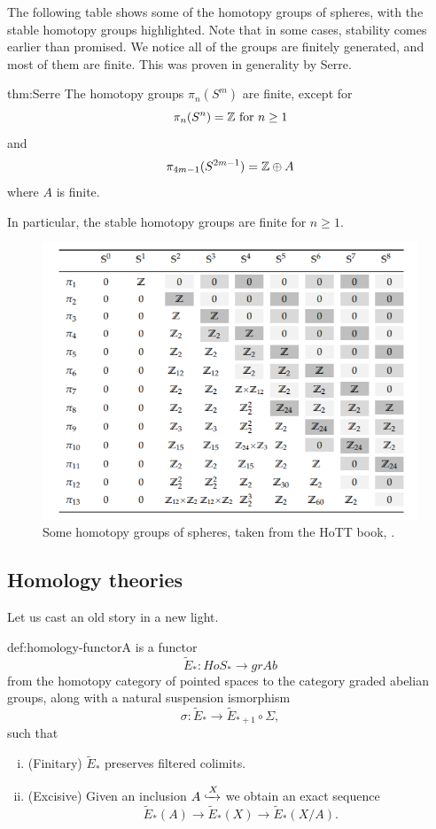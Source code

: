The following table shows some of the homotopy groups of spheres, with the stable homotopy groups highlighted. Note that in some cases, stability comes earlier than promised. We notice all of the groups are finitely generated, and most of them are finite. This was proven in generality by Serre.
\begin{theorem}[Serre]{thm:Serre}
    The homotopy groups $\pi_n(S^m)$  are finite, except for
    $$\pi_n(S^n)=\mathbb{Z} \text{ for } n\geq 1$$
    and $$\pi_{4m-1}(S^{2m-1})=\mathbb{Z}\oplus A$$
    where $A$ is finite.
\end{theorem}

In particular, the stable homotopy groups are finite for $n\geq 1.$
\begin{figure}[h!]
\includegraphics[width=14cm]{Content/stable.png}
\centering
\caption{Some homotopy groups of spheres, taken from the HoTT book, \cite{HoTT}.}
\end{figure}

\subsection{Homology theories}
Let us cast an old story in a new light. 
\begin{definition}{def:homology-functor}A  is a functor
$$\tilde{E}_*:HoS_*\rightarrow grAb$$
from the homotopy category of pointed spaces to the category graded abelian groups, along with a natural suspension ismorphism $$\sigma:\tilde{E}_*\rightarrow \tilde{E}_{*+1}\circ \Sigma,$$ such that
\begin{enumerate}[(i)]
\item (Finitary) $\tilde{E}_*$ preserves filtered colimits.
\item (Excisive) Given an inclusion $A\xhookrightarrow X$ we obtain an exact sequence $$\tilde{E}_*(A)\rightarrow \tilde{E}_*(X)\rightarrow \tilde{E}_*(X/A).$$
\end{enumerate}
\end{definition}

